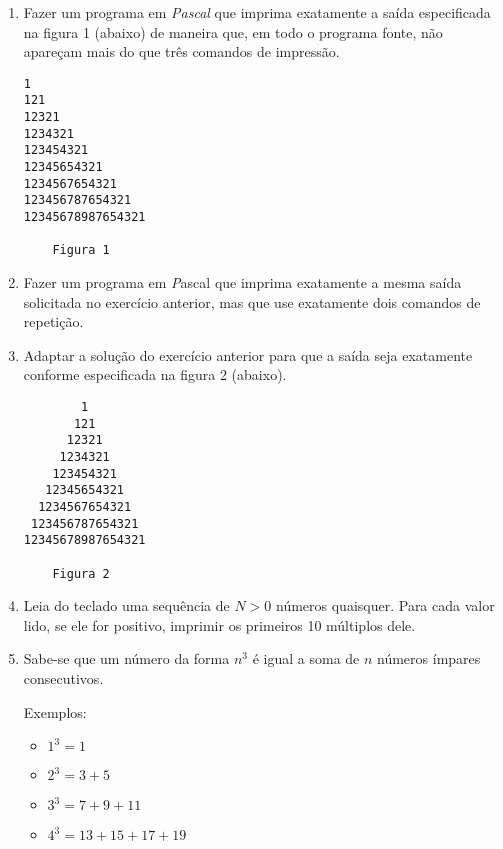 \begin{enumerate}
\item Fazer um programa em \emph{Pascal} que imprima
  exatamente a saída especificada na figura 1 (abaixo) de maneira que,
  em todo o programa fonte, não apareçam mais do que três comandos de impressão.

\begin{center}
\begin{minipage}{5cm}
\begin{verbatim}
1
121
12321
1234321
123454321
12345654321
1234567654321
123456787654321
12345678987654321

    Figura 1
\end{verbatim}
\end{minipage}
\end{center}

\item Fazer um programa em {\emph Pascal} que imprima
  exatamente a mesma saída solicitada no exercício anterior, mas que
  use exatamente dois comandos de repetição.

\item Adaptar a solução do exercício anterior para que a saída seja
  exatamente conforme especificada na figura 2 (abaixo).

\begin{center}
\begin{minipage}{5cm}
\begin{verbatim}
        1
       121
      12321
     1234321
    123454321
   12345654321
  1234567654321
 123456787654321
12345678987654321

    Figura 2
\end{verbatim}
\end{minipage}
\end{center}


\item Leia do teclado uma sequência de  $N > 0$ números quaisquer. Para cada
valor lido, se ele for positivo, imprimir os primeiros 10 múltiplos
dele.


\item Sabe-se que um número da forma $n^3$ é igual a soma de $n$ números
ímpares consecutivos.

Exemplos:
\begin{itemize}
\item
$1^3 = 1$
\item
$2^3 = 3 + 5$
\item
$3^3 = 7 + 9 + 11$
\item
$4^3 = 13 + 15 + 17 + 19$
\end{itemize}


\end{enumerate}
